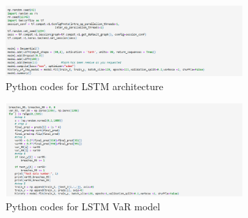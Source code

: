 \documentclass[a4paper,11pt,oneside]{book}
\begin{document}
\begin{appendix}
	\begin{figure}[!h]
		\centering
		\includegraphics[width=0.8\textwidth]{figures/code3}
		\caption{Python codes for LSTM architecture}
	\end{figure}
	 \vspace{50mm}
	\begin{figure}[!h]
		\centering
		\includegraphics[width=0.8\textwidth]{figures/code4}
		\caption{Python codes for LSTM VaR model}
	\end{figure}

	
	
\end{appendix}














\end{document}
